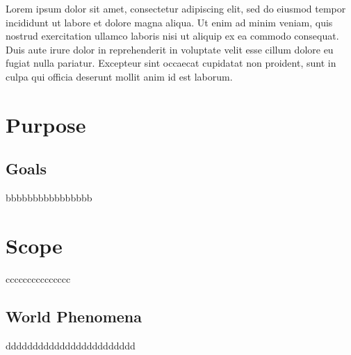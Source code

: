 Lorem ipsum dolor sit amet, consectetur adipiscing elit, sed do eiusmod tempor incididunt ut labore et dolore magna aliqua. Ut enim ad minim veniam, quis nostrud exercitation ullamco laboris nisi ut aliquip ex ea commodo consequat. Duis aute irure dolor in reprehenderit in voluptate velit esse cillum dolore eu fugiat nulla pariatur. Excepteur sint occaecat cupidatat non proident, sunt in culpa qui officia deserunt mollit anim id est laborum.

\newpage

\section{Purpose}
\label{sec:purpose}%

\subsection{Goals}
\label{subsec:goals}%
bbbbbbbbbbbbbbbb

\section{Scope}
\label{sec:scope}%
ccccccccccccccc

\subsection{World Phenomena}
\label{subsec:world_phenomena}%
dddddddddddddddddddddddd


